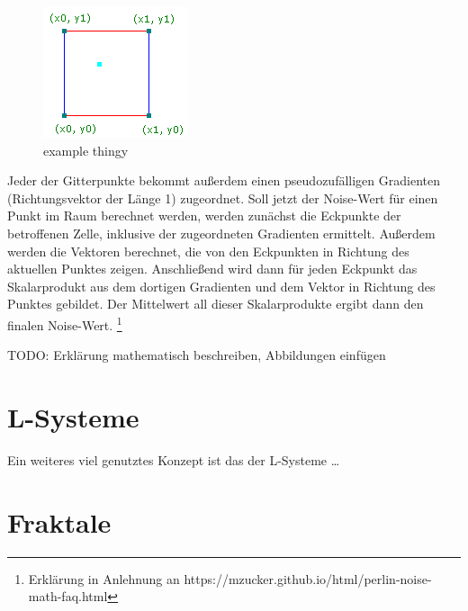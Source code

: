 \begin{figure}[h]
    \centering
    \includegraphics[width=\imgHeight]{images/noise_example.png}
    \caption{example thingy}
    \label{fig:noise_example}
\end{figure}

Jeder der Gitterpunkte bekommt außerdem einen pseudozufälligen Gradienten (Richtungsvektor der Länge 1) zugeordnet. Soll jetzt der Noise-Wert
für einen Punkt im Raum berechnet werden, werden zunächst die Eckpunkte der betroffenen Zelle, inklusive der zugeordneten Gradienten ermittelt.
Außerdem werden die Vektoren berechnet, die von den Eckpunkten in Richtung des aktuellen Punktes zeigen. Anschließend wird dann für jeden Eckpunkt
das Skalarprodukt aus dem dortigen Gradienten und dem Vektor in Richtung des Punktes gebildet. Der Mittelwert all dieser Skalarprodukte ergibt
dann den finalen Noise-Wert. \cite{16_perlin}\footnote{Erklärung in Anlehnung an https://mzucker.github.io/html/perlin-noise-math-faq.html}

TODO: Erklärung mathematisch beschreiben, Abbildungen einfügen

\section{L-Systeme}
Ein weiteres viel genutztes Konzept ist das der L-Systeme \dots

\section{Fraktale}
\cite{19_mandelbrot_frame}